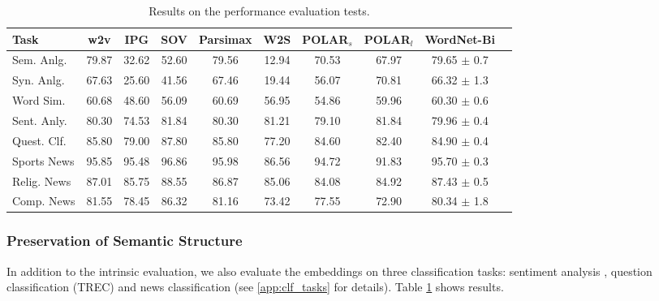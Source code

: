 \documentclass[11pt,a4paper]{article}
\begin{document}
\begin{table}
    \centering
	\begin{tabular}{lccccccccc}
		\hline \hline 
		\textbf{Task} & \textbf{w2v} & \textbf{IPG} & \textbf{SOV} & \textbf{Parsimax} & \textbf{W2S} & \textbf{POLAR$_s$} & \textbf{POLAR$_l$} & \textbf{WordNet-Bi} \\ \hline \hline %
	    Sem. Anlg. & 79.87 & 32.62 & 52.60 & 79.56 & 12.94 & 70.53 & 67.97 & 79.65 $\pm$ 0.7 \\
	    Syn. Anlg. & 67.63 & 25.60 & 41.56 & 67.46 & 19.44 & 56.07 & 70.81 & 66.32 $\pm$ 1.3 \\ 
	    \hline %
	    Word Sim. & 60.68 & 48.60 & 56.09 & 60.69 & 56.95 & 54.86 & 59.96 & 60.30 $\pm$ 0.6 \\
	    \hline %
	    Sent. Anly. & 80.30 & 74.53 & 81.84 & 80.30 & 81.21 & 79.10 & 81.84 & 79.96 $\pm$ 0.4 \\ \hline %
	    Quest. Clf. & 85.80 & 79.00 & 87.80 & 85.80 & 77.20 & 84.60 & 82.40 & 84.90 $\pm$ 0.4 \\ \hline %
	    Sports News & 95.85 & 95.48 & 96.86 & 95.98 & 86.56 & 94.72 & 91.83 & 95.70 $\pm$ 0.3 \\
	    Relig. News & 87.01 & 85.75 & 88.55 & 86.87 & 85.06 & 84.08 & 84.92 & 87.43 $\pm$ 0.5 \\
	    Comp. News & 81.55 & 78.45 & 86.32 & 81.16 & 73.42 & 77.55 & 72.90 & 80.34 $\pm$ 1.8 \\ \hline \hline %
	\end{tabular}
	\caption{ Results on the performance evaluation tests. }
	\label{tab:performance_tests}
\end{table}

\subsubsection{Preservation of Semantic Structure}
In addition to the intrinsic evaluation, we also evaluate
the embeddings on three classification tasks: sentiment analysis \citep{socher13treebank}, question classification (TREC) \citep{li06learning} and news classification \citep{faruqui15sparse} (see \ref{app:clf_tasks} for details). 
Table \ref{tab:performance_tests} shows results.

\end{document}
